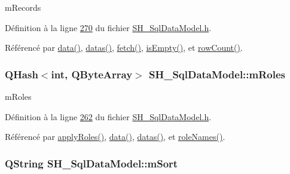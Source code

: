 m\-Records 



Définition à la ligne \hyperlink{SH__SqlDataModel_8h_source_l00270}{270} du fichier \hyperlink{SH__SqlDataModel_8h_source}{S\-H\-\_\-\-Sql\-Data\-Model.\-h}.



Référencé par \hyperlink{classSH__SqlDataModel_a30cc763618d73a1bb5410c84812c0b9f}{data()}, \hyperlink{classSH__SqlDataModel_a6d91d42cfaf86d1fbbaeeb7a32efc26b}{datas()}, \hyperlink{classSH__SqlDataModel_a8d9b08d282a304945b9ee2f474020980}{fetch()}, \hyperlink{classSH__SqlDataModel_a9bc7c550e40c23632445678b87fd4b48}{is\-Empty()}, et \hyperlink{classSH__SqlDataModel_adde1b5e5e50b0bd9ca4096447c75ca15}{row\-Count()}.

\hypertarget{classSH__SqlDataModel_ad1e46c72a6aeb83e3e7bb0c3110d12a4}{
\subsubsection[{m\-Roles}]{\setlength{\rightskip}{0pt plus 5cm}Q\-Hash$<$int, Q\-Byte\-Array$>$ S\-H\-\_\-\-Sql\-Data\-Model\-::m\-Roles\hspace{0.3cm}{\ttfamily [private]}}}\label{classSH__SqlDataModel_ad1e46c72a6aeb83e3e7bb0c3110d12a4}


m\-Roles 



Définition à la ligne \hyperlink{SH__SqlDataModel_8h_source_l00262}{262} du fichier \hyperlink{SH__SqlDataModel_8h_source}{S\-H\-\_\-\-Sql\-Data\-Model.\-h}.



Référencé par \hyperlink{classSH__SqlDataModel_a2e529bea67d6b31d8eb4723a81a1b354}{apply\-Roles()}, \hyperlink{classSH__SqlDataModel_a30cc763618d73a1bb5410c84812c0b9f}{data()}, \hyperlink{classSH__SqlDataModel_a6d91d42cfaf86d1fbbaeeb7a32efc26b}{datas()}, et \hyperlink{classSH__SqlDataModel_a3f45d120bfe91faeb921b160e01a8a3f}{role\-Names()}.

\hypertarget{classSH__SqlDataModel_a7e36fd116b7cb50e949ee56af0c31772}{
\subsubsection[{m\-Sort}]{\setlength{\rightskip}{0pt plus 5cm}Q\-String S\-H\-\_\-\-Sql\-Data\-Model\-::m\-Sort\hspace{0.3cm}{\ttfamily [private]}}}\label{classSH__SqlDataModel_a7e36fd116b7cb50e949ee56af0c31772}


